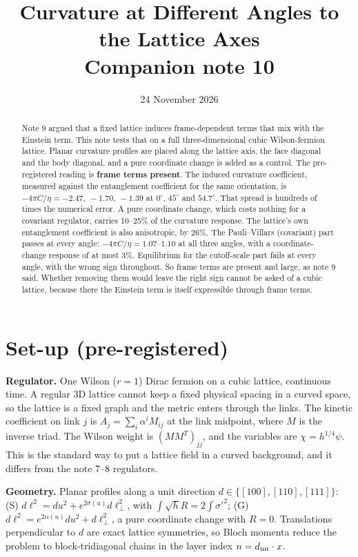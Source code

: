 \documentclass[11pt]{article}
\title{Curvature at Different Angles to the Lattice Axes\\[4pt]\large Companion note 10}
\author{}\date{24 November 2026}
\begin{document}
\maketitle
\begin{abstract}
Note 9 argued that a fixed lattice induces frame-dependent terms that mix with the Einstein term. This note tests that on a full three-dimensional cubic Wilson-fermion lattice. Planar curvature profiles are placed along the lattice axis, the face diagonal and the body diagonal, and a pure coordinate change is added as a control. The pre-registered reading is \textbf{frame terms present}. The induced curvature coefficient, measured against the entanglement coefficient for the same orientation, is $-4\pi C/\eta=-2.47,\ -1.70,\ -1.39$ at $0^\circ$, $45^\circ$ and $54.7^\circ$. That spread is hundreds of times the numerical error. A pure coordinate change, which costs nothing for a covariant regulator, carries 10--25\% of the curvature response. The lattice's own entanglement coefficient is also anisotropic, by 26\%. The Pauli--Villars (covariant) part passes at every angle: $-4\pi C/\eta=1.07$--$1.10$ at all three angles, with a coordinate-change response of at most 3\%. Equilibrium for the cutoff-scale part fails at every angle, with the wrong sign throughout. So frame terms are present and large, as note 9 said. Whether removing them would leave the right sign cannot be asked of a cubic lattice, because there the Einstein term is itself expressible through frame terms.
\end{abstract}

\section{Set-up (pre-registered)}
\textbf{Regulator.} One Wilson ($r=1$) Dirac fermion on a cubic lattice, continuous time. A regular 3D lattice cannot keep a fixed physical spacing in a curved space, so the lattice is a fixed graph and the metric enters through the links. The kinetic coefficient on link $j$ is $A_j=\sum_i\alpha^iM_{ij}$ at the link midpoint, where $M$ is the inverse triad. The Wilson weight is $(MM^T)_{jj}$, and the variables are $\chi=h^{1/4}\psi$. This is the standard way to put a lattice field in a curved background, and it differs from the note 7--8 regulators.

\textbf{Geometry.} Planar profiles along a unit direction $d\in\{[100],[110],[111]\}$:
(S) $d\ell^2=du^2+e^{2\sigma(u)}d\ell_\perp^2$, with $\int\!\sqrt hR=2\int\sigma'^2$;
(G) $d\ell^2=e^{2\alpha(u)}du^2+d\ell_\perp^2$, a pure coordinate change with $R=0$.
Translations perpendicular to $d$ are exact lattice symmetries, so Bloch momenta reduce the problem to block-tridiagonal chains in the layer index $n=d_{\rm int}\cdot x$.
\end{document}
